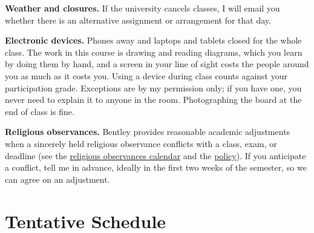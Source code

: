 \documentclass[11pt,letterpaper]{article}
\begin{document}
\textbf{Weather and closures.} If the university cancels classes, I will email you whether there is an alternative assignment or arrangement for that day.

\textbf{Electronic devices.} Phones away and laptops and tablets closed for the whole class. The work in this course is drawing and reading diagrams, which you learn by doing them by hand, and a screen in your line of sight costs the people around you as much as it costs you. Using a device during class counts against your participation grade. Exceptions are by my permission only; if you have one, you never need to explain it to anyone in the room. Photographing the board at the end of class is fine.

\textbf{Religious observances.} Bentley provides reasonable academic adjustments when a sincerely held religious observance conflicts with a class, exam, or deadline (see the \href{https://downloads.bentley.edu/general/Religious\%20Observances\%202026-2027.pdf}{religious observances calendar} and the \href{https://catalog.bentley.edu/undergraduate/academic-policies-procedures/}{policy}). If you anticipate a conflict, tell me in advance, ideally in the first two weeks of the semester, so we can agree on an adjustment.

\section*{Tentative Schedule}
\end{document}
